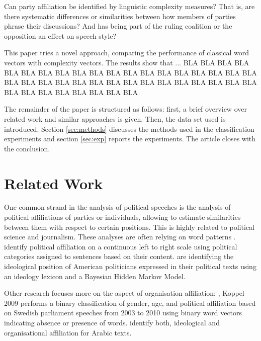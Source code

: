 \documentclass[11pt]{article}
\begin{document}
Can party affiliation be identified by linguistic complexity measures? That is, are there systematic differences or similarities between how members of parties phrase their discussions? And has being part of the ruling coalition or the opposition an effect on speech style?

This paper tries a novel approach, comparing the performance of classical word vectors with complexity vectors. %
The results show that ... BLA BLA BLA BLA BLA BLA BLA BLA BLA BLA BLA BLA BLA BLA BLA BLA BLA BLA BLA BLA BLA BLA BLA BLA BLA BLA BLA BLA BLA BLA BLA BLA BLA BLA BLA BLA BLA BLA BLA BLA BLA BLA 

The remainder of the paper is structured as follows: first, a brief overview over related work and similar approaches is given. Then, the data set used is introduced. Section \ref{sec:methods} discusses the methods used in the classification experiments and section \ref{sec:exp} reports the experiments. The article closes with the conclusion.



\section{Related Work}

One common strand in the analysis of political speeches is the analysis of political affiliations of parties or individuals, allowing to estimate similarities between them with respect to certain positions. This is highly related to political science and journalism. These analyses are often relying on word patterns \parencite[cf.][124]{lowe2013}.
\textcite[][]{lowe2011} identify political affiliation on a continuous left to right scale using political categories assigned to sentences based on their content.
\textcite[][]{sim2013} are identifying the ideological position of American politicians expressed in their political texts using an ideology lexicon and a Bayesian Hidden Markov Model.

Other research focuses more on the aspect of organisation affiliation: \textcite[][]{dallhof2013}, Koppel 2009
\textcite[][]{dallhof2013} performs a binary classification of gender, age, and political affiliation based on Swedish parliament speeches from 2003 to 2010 using binary word vectors indicating absence or presence of words.
\textcite[][]{koppel2009} identify both, ideological and organisational affiliation for Arabic texts.
\end{document}
